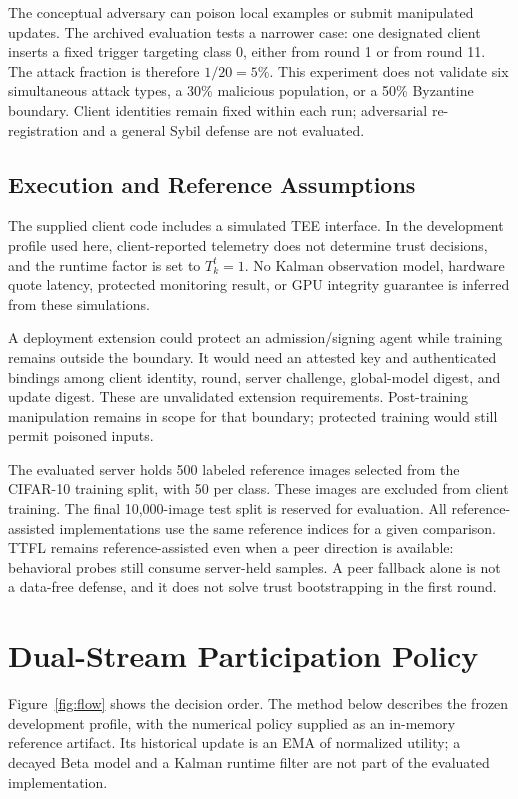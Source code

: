 \documentclass[conference,compsoc]{IEEEtran}
\begin{document}
The conceptual adversary can poison local examples or submit manipulated updates. The archived evaluation tests a narrower case: one designated client inserts a fixed trigger targeting class 0, either from round 1 or from round 11. The attack fraction is therefore $1/20=5\%$. This experiment does not validate six simultaneous attack types, a 30\% malicious population, or a 50\% Byzantine boundary. Client identities remain fixed within each run; adversarial re-registration and a general Sybil defense are not evaluated.

\subsection{Execution and Reference Assumptions}
The supplied client code includes a simulated TEE interface. In the development profile used here, client-reported telemetry does not determine trust decisions, and the runtime factor is set to $T_k^t=1$. No Kalman observation model, hardware quote latency, protected monitoring result, or GPU integrity guarantee is inferred from these simulations.

A deployment extension could protect an admission/signing agent while training remains outside the boundary. It would need an attested key and authenticated bindings among client identity, round, server challenge, global-model digest, and update digest. These are unvalidated extension requirements. Post-training manipulation remains in scope for that boundary; protected training would still permit poisoned inputs.

The evaluated server holds 500 labeled reference images selected from the CIFAR-10 training split, with 50 per class. These images are excluded from client training. The final 10,000-image test split is reserved for evaluation. All reference-assisted implementations use the same reference indices for a given comparison. TTFL remains reference-assisted even when a peer direction is available: behavioral probes still consume server-held samples. A peer fallback alone is not a data-free defense, and it does not solve trust bootstrapping in the first round.

\section{Dual-Stream Participation Policy}
Figure~\ref{fig:flow} shows the decision order. The method below describes the frozen development profile, with the numerical policy supplied as an in-memory reference artifact. Its historical update is an EMA of normalized utility; a decayed Beta model and a Kalman runtime filter are not part of the evaluated implementation.
\end{document}
